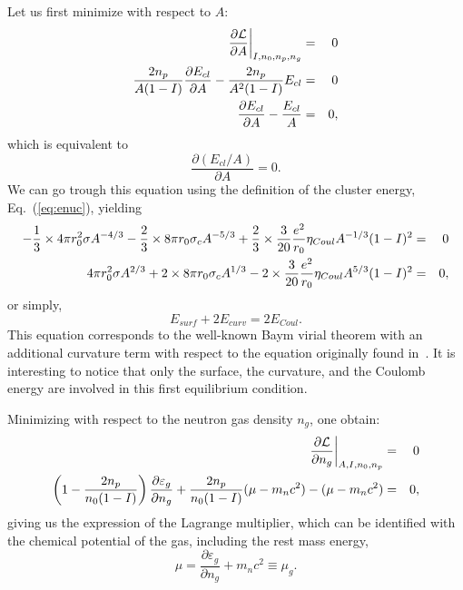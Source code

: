 Let us first minimize with respect to $A$:
%
\begin{eqnarray}
  \frac{\partial \mathcal{L}}{\partial A}\bigg|_{I,n_0,n_p,n_g} &=& 0 \notag\\
  \frac{2n_p}{A(1-I)}\frac{\partial E_{cl}}{\partial A} -
  \frac{2n_p}{A^2(1-I)}E_{cl} &=& 0 \notag\\
  \frac{\partial E_{cl}}{\partial A} - \frac{E_{cl}}{A} &=& 0,
\end{eqnarray}
%
which is equivalent to
%
\begin{equation}
  \frac{\partial (E_{cl}/A)}{\partial A} = 0.
\end{equation}
%
We can go trough this equation using the definition of the cluster energy, 
Eq.~(\ref{eq:enuc}), yielding
%
\begin{eqnarray}
  -\frac{1}{3}\times 4\pi r_0^2 \sigma A^{-4/3} - \frac{2}{3}\times 8\pi r_0\sigma_cA^{-5/3}
  + \frac{2}{3}\times\frac{3}{20}\frac{e^2}{r_0}\eta_{Coul}A^{-1/3}(1-I)^2 &=&
  0 \notag\\
  4\pi r_0^2 \sigma A^{2/3} + 2\times 8\pi r_0\sigma_cA^{1/3}
  - 2\times \frac{3}{20}\frac{e^2}{r_0}\eta_{Coul}A^{5/3}(1-I)^2 &=& 0 \notag,
\end{eqnarray}
or simply,
%
\begin{equation}
  E_{surf} + 2E_{curv} = 2E_{Coul}.\label{eq:virial}
\end{equation}
%
This equation corresponds to the well-known Baym virial theorem with an 
additional curvature term with respect to the equation originally found 
in~\cite{BBP}. It is interesting to notice that only the surface, the 
curvature, and the Coulomb energy are involved in this first equilibrium 
condition.

Minimizing with respect to the neutron gas density $n_g$, one obtain:
%
\begin{eqnarray}
  \frac{\partial \mathcal{L}}{\partial n_g}\bigg|_{A,I,n_0,n_p} &=& 0 \notag\\
  \left(1-\frac{2n_p}{n_0(1-I)}\right)\frac{\partial \varepsilon_g}{\partial
n_g} + \frac{2n_p}{n_0(1-I)}(\mu - m_nc^2) - (\mu - m_nc^2) &=& 0,
\end{eqnarray}
%
giving us the expression of the Lagrange multiplier, which can be identified
with the chemical potential of the gas, including the rest mass energy,
%
\begin{equation}
  \mu = \frac{\partial \varepsilon_g}{\partial n_g} + m_nc^2 \equiv
  \mu_g.\label{eq:lagrange}
\end{equation}
%

